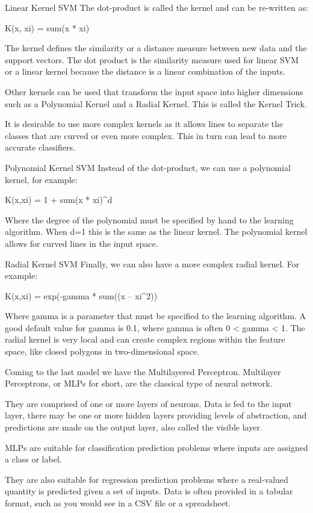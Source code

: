 \documentclass[12pt]{article}
\begin{document}
Linear Kernel SVM
The dot-product is called the kernel and can be re-written as:

K(x, xi) = sum(x * xi)

The kernel defines the similarity or a distance measure between new data and the support vectors. The dot product is the similarity measure used for linear SVM or a linear kernel because the distance is a linear combination of the inputs.

Other kernels can be used that transform the input space into higher dimensions such as a Polynomial Kernel and a Radial Kernel. This is called the Kernel Trick.

It is desirable to use more complex kernels as it allows lines to separate the classes that are curved or even more complex. This in turn can lead to more accurate classifiers.

Polynomial Kernel SVM
Instead of the dot-product, we can use a polynomial kernel, for example:

K(x,xi) = 1 + sum(x * xi)^d

Where the degree of the polynomial must be specified by hand to the learning algorithm. When d=1 this is the same as the linear kernel. The polynomial kernel allows for curved lines in the input space.

Radial Kernel SVM
Finally, we can also have a more complex radial kernel. For example:

K(x,xi) = exp(-gamma * sum((x – xi^2))

Where gamma is a parameter that must be specified to the learning algorithm. A good default value for gamma is 0.1, where gamma is often 0 < gamma < 1. The radial kernel is very local and can create complex regions within the feature space, like closed polygons in two-dimensional space.


Coming to the last model we have the Multilayered Perceptron. Multilayer Perceptrons, or MLPs for short, are the classical type of neural network.

They are comprised of one or more layers of neurons. Data is fed to the input layer, there may be one or more hidden layers providing levels of abstraction, and predictions are made on the output layer, also called the visible layer.

MLPs are suitable for classification prediction problems where inputs are assigned a class or label.

They are also suitable for regression prediction problems where a real-valued quantity is predicted given a set of inputs. Data is often provided in a tabular format, such as you would see in a CSV file or a spreadsheet.
\end{document}
